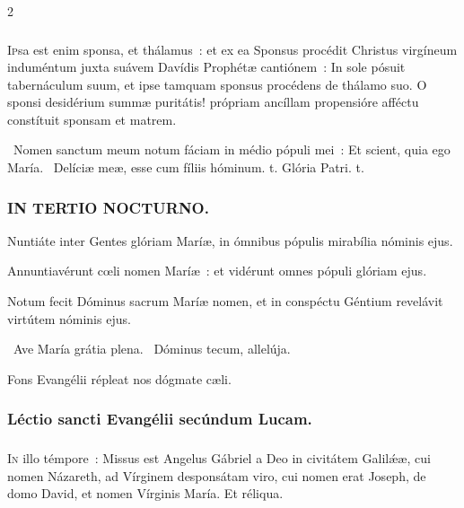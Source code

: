\documentclass[9pt,twoside]{extarticle}
\begin{document}
\begin{multicols}{2}
\subsubsection*{\center {}}
\lettrine{I}psa est enim sponsa, et thálamus~: et ex ea Sponsus procédit Christus virgíneum induméntum juxta suávem Davídis Prophétæ cantiónem~: In sole pósuit tabernáculum suum, et ipse tamquam sponsus procédens de thálamo suo. O sponsi desidérium summæ puritátis! própriam ancíllam propensióre afféctu constítuit sponsam et matrem.

\begin{tightlist}{}
\item {}~Nomen sanctum meum notum fáciam in médio pópuli mei~: \textred{*} Et scient, quia ego María. ~Delíciæ meæ, esse cum fíliis hóminum. t. Glória Patri. t.
\end{tightlist}

\subsubsection*{\center \textsc{IN TERTIO NOCTURNO.}}
\begin{tightlist}{}
\item {} Nuntiáte inter Gentes glóriam Maríæ, in ómnibus pópulis mirabília nóminis ejus.
\item {} Annuntiavérunt cœli nomen Maríæ~: et vidérunt omnes pópuli glóriam ejus.
\item {} Notum fecit Dóminus sacrum Maríæ nomen, et in conspéctu Géntium revelávit virtútem nóminis ejus.
\item {}~Ave María grátia plena. ~Dóminus tecum, allelúja.
\item {\small {} Fons Evangélii répleat nos dógmate cæli.}
\end{tightlist}

\subsubsection*{\center Léctio sancti Evangélii secúndum Lucam.}
\subsubsection*{\center {}}
\lettrine{I}n illo témpore~: Missus est Angelus Gábriel a Deo in civitátem Galilǽæ, cui nomen Názareth, ad Vírginem desponsátam viro, cui nomen erat Joseph, de domo David, et nomen Vírginis María. Et réliqua.


\end{multicols}
\end{document}
